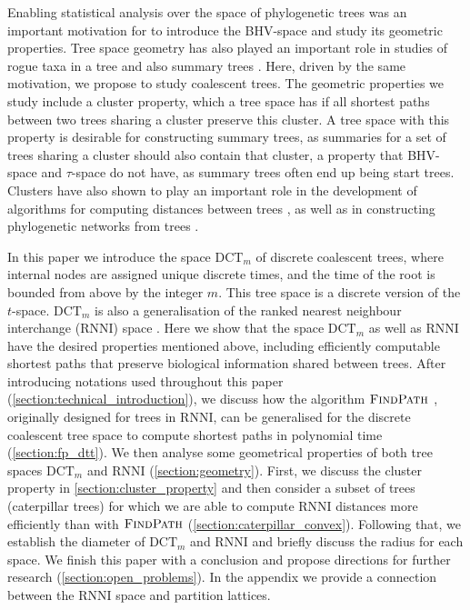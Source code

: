 \documentclass[11pt]{amsart}
\newcommand{\rnni}{\mathrm{RNNI}}
\newcommand{\findpath}{\textsc{FindPath}}
\newcommand{\dct}{\mathrm{DCT}}
\newcommand{\summary}[1]{} %
\begin{document}
\summary{Why we want to investigate geometrical properties of $\dct_m$ and $\rnni$}
Enabling statistical analysis over the space of phylogenetic trees was an important motivation for \textcite{Billera2001-rj} to introduce the BHV-space and study its geometric properties.
Tree space geometry has also played an important role in studies of rogue taxa in a tree \autocite{Cueto2011-bh} and also summary trees \autocite{Miller2015-rk}.
Here, driven by the same motivation, we propose to study coalescent trees.
The geometric properties we study include a cluster property, which a tree space has if all shortest paths between two trees sharing a cluster preserve this cluster.
A tree space with this property is desirable for constructing summary trees, as summaries for a set of trees sharing a cluster should also contain that cluster, a property that BHV-space and $\tau$-space do not have, as summary trees often end up being start trees.
Clusters have also shown to play an important role in the development of algorithms for computing distances between trees \autocite{Bordewich2005-nx}, as well as in constructing phylogenetic networks from trees \autocite{Baroni2006-cv}.

\summary{Structure of the paper.}
In this paper we introduce the space $\dct_m$ of discrete coalescent trees, where internal nodes are assigned unique discrete times, and the time of the root is bounded from above by the integer $m$.
This tree space is a discrete version of the $t$-space.
$\dct_m$ is also a generalisation of the ranked nearest neighbour interchange ($\rnni$) space \autocite{Collienne2021}.
Here we show that the space $\dct_m$ as well as $\rnni$ have the desired properties mentioned above, including efficiently computable shortest paths that preserve biological information shared between trees.
After introducing notations used throughout this paper (\autoref{section:technical_introduction}), we discuss how the algorithm $\findpath$ \autocite{Collienne2021}, originally designed for trees in $\rnni$, can be generalised for the discrete coalescent tree space to compute shortest paths in polynomial time (\autoref{section:fp_dtt}).
We then analyse some geometrical properties of both tree spaces $\dct_m$ and $\rnni$ (\autoref{section:geometry}).
First, we discuss the cluster property in \autoref{section:cluster_property} and then consider a subset of trees (caterpillar trees) for which we are able to compute $\rnni$ distances more efficiently than with $\findpath$ (\autoref{section:caterpillar_convex}).
Following that, we establish the diameter of $\dct_m$ and $\rnni$ and briefly discuss the radius for each space.
We finish this paper with a conclusion and propose directions for further research (\autoref{section:open_problems}).
In the appendix we provide a connection between the $\rnni$ space and partition lattices.
\end{document}
